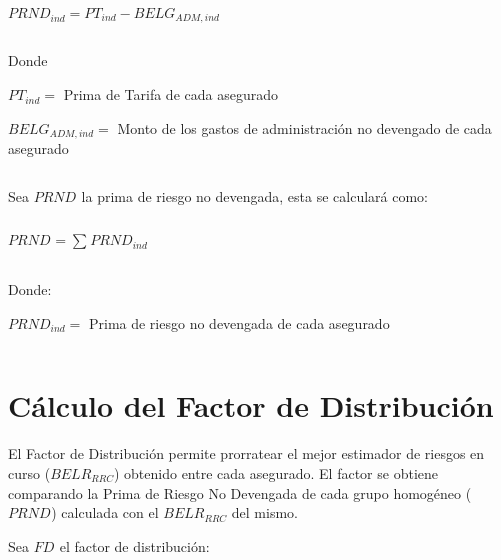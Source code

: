\documentclass[11pt,twoside,openright,spanish]{report}
\numberwithin{equation}{chapter}
\numberwithin{figure}{chapter}
\numberwithin{table}{chapter}
\begin{document}
	 

$ $

 
	
		{\centering
		${PRND}_{ind}^{}={{PT}_{ind}-BELG_{ADM,ind}}$
		\noindent
		
	}	
	
	
	 

$ $

 
	
	Donde
	
	 
	
	$PT_{ind}=$ Prima de Tarifa de cada asegurado
	
	$BELG_{ADM,ind}=$ Monto de los gastos de administración no devengado de cada asegurado
	
	 

$ $

 
	
	Sea $PRND_{}$ la prima de riesgo no devengada, esta se calculará como:
	
	 

$ $

 
	
	
		{\centering
	$PRND_{}={\sum _{}^{}PRND_{ind}^{}}$
	
		\noindent
	
}	

	
	 

$ $

 
	
	Donde:
	
	 
	
	$PRND_{ind}=$ Prima de riesgo no devengada de cada asegurado
	
	 

$ $

 
	
	\section{Cálculo del Factor de Distribución}
	
	 
	
	El Factor de Distribución permite prorratear el mejor estimador de riesgos en curso ($BELR_{RRC}$) obtenido entre cada asegurado. El factor se obtiene comparando la Prima de Riesgo No Devengada de cada grupo homogéneo ($PRND_{}$) calculada con el $BELR_{RRC}$ del mismo.
	
	 
	
	Sea $FD_{}$ el factor de distribución:
	
	 

$ $
\end{document}
